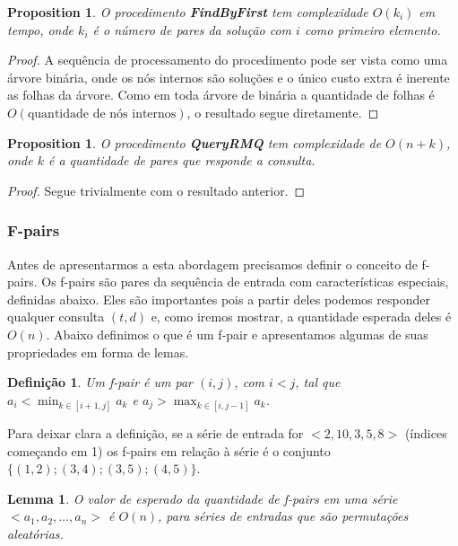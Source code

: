\documentclass[12pt]{article}
\newtheorem{lem}[thm]{Lemma}
\newtheorem{prop}[thm]{Proposition}
\newtheorem{defi}[thm]{Definição}
\begin{document}
\begin{prop}
O procedimento {\bf FindByFirst} tem complexidade $O(k_i)$ em tempo,
onde $k_i$ é o número de pares da solução com $i$ como primeiro elemento.
\end{prop}  
\begin{proof}
A sequência de processamento do procedimento pode ser vista
como uma árvore binária, onde os nós internos são soluções e o único
custo extra é inerente as folhas da árvore. Como em toda
árvore de binária a quantidade de folhas é $O(\text{quantidade de nós internos})$,
o resultado segue diretamente.
\end{proof} 

\begin{prop}
O procedimento {\bf QueryRMQ} tem complexidade de $O(n + k)$,
onde $k$ é a quantidade de pares que responde a consulta.
\end{prop}

\begin{proof}
Segue trivialmente com o resultado anterior.
\end{proof} 

\subsubsection{F-pairs}

Antes de apresentarmos a esta abordagem precisamos definir 
o conceito de f-pairs. Os f-pairs são pares da sequência de entrada
com características especiais, definidas abaixo. Eles são importantes pois
a partir deles podemos responder qualquer consulta $(t, d)$ e,
como iremos mostrar, a quantidade esperada deles é $O(n)$. 
Abaixo definimos o que é um f-pair e apresentamos algumas de suas propriedades
em forma de lemas.

\begin{defi}
Um f-pair é um par $(i, j)$, com $i < j$, tal que $a_i < \min_{k \in [i + 1, j]} a_k$ e $a_j > \max_{k \in [i, j -1]} a_k$.
\end{defi}
Para deixar clara a definição, se a série de entrada for $<2, 10, 3, 5, 8>$ (índices começando em 1) os f-pairs
em relação à série é o conjunto $\{(1, 2); (3, 4); (3, 5); (4, 5) \}$. 

\begin{lem}
O valor de esperado da quantidade de f-pairs em uma
série $<a_1, a_2, \ldots, a_n>$ é $O(n)$, para
séries de entradas que são permutações aleatórias.
\label{amountf}
\end{lem}
\end{document}
